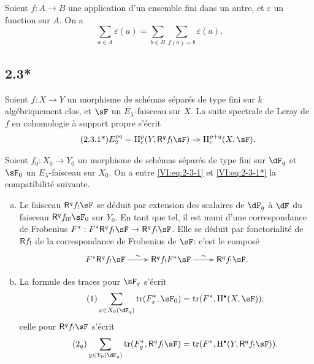 Soient $f:A\to B$ une application d'un ensemble fini dans un autre, et 
$\varepsilon$ un function sur $A$. On a 
\begin{equation*}\tag{2.3.1}\label{VI:eq:2-3-1}
  \sum_{a\in A} \varepsilon(a) = \sum_{b\in B} \sum_{f(a)=b} \varepsilon(a) \text{.}
\end{equation*}





\subsection*{2.3*}\label{VI:2-3*}

Soient $f:X\to Y$ un morphisme de sch\'emas s\'epar\'es de type fini sur $k$ 
alg\'ebriquement clos, et $\sF$ un $E_\lambda$-faisceau sur $X$. La suite 
spectrale de Leray de $f$ en cohomologie \`a support propre s'\'ecrit 
\begin{align*}\tag{2.3.1*}\label{VI:eq:2-3-1*}
  E_2^{p q} = \h_c^p(Y,\R^q f_! \sF) \Rightarrow \h_c^{p+q}(X,\sF) \text{.}
\end{align*}

Soient $f_0:X_0 \to Y_0$ un morphisme de sch\'emas s\'epar\'es de type fini sur 
$\dF_q$ et $\sF_0$ un $E_\lambda$-faisceau sur $X_0$. On a entre 
\eqref{VI:eq:2-3-1} et \eqref{VI:eq:2-3-1*} la compatibilit\'e suivante. 

\begin{enumerate}[a)]
  \item Le faisceau $\R^q f_! \sF$ se d\'eduit par extension des scalaires de 
    $\dF_q$ \`a $\dF$ du faisceau $\R^q f_{0!} \sF_0$ sur $Y_0$. En tant que 
    tel, il est muni d'une correspondance de Frobenius 
    $F^\ast:F^\ast\R^q f_! \sF \to \R^q f_! \sF$. Elle se d\'eduit par 
    fonctorialit\'e de $\mathsf{R} f_!$ de la correspondance de Frobenius de $\sF$: 
    c'est le compos\'e 
    \[\xymatrix{
      F^\ast \R^q f_! \sF \ar[r]^-\sim 
        & \R^q f_! F^\ast \sF \ar[r]^-\sim 
        & \R^q f_! \sF \text{.}
    }\]
  \item La formule des traces pour $\sF_q$ s'\'ecrit 
    \begin{align*}\tag{1}\label{VI:eq:1}
      \sum_{x\in X_0(\dF_q)} \tr(F_x^\ast,\sF_0) = \tr(F^\ast,\h^\bullet(X,\sF)) \text{;}
    \end{align*}
    celle pour $\R^q f_! \sF$ s'\'ecrit 
    \begin{align*}\tag{2$_q$}\label{VI:eq:2_q} 
      \sum_{y\in Y_0(\dF_q)} \tr(F_y^\ast,\R^q f_! \sF) = \tr(F^\ast, \h^\bullet(Y,\R^q f_! \sF)) \text{.}
    \end{align*}
\end{enumerate}

